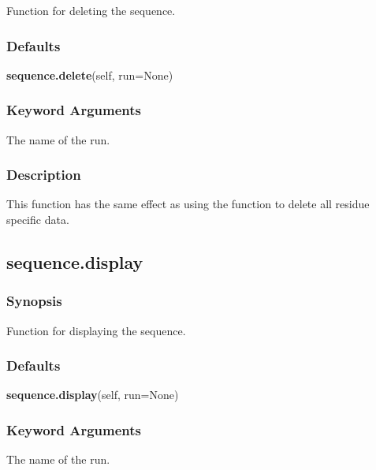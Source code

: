 Function for deleting the sequence.



\subsubsection{Defaults}

\textsf{\textbf{sequence.delete}(self, run=None)}


\subsubsection{Keyword Arguments}

  The name of the run. 




\subsubsection{Description}

This function has the same effect as using the  function to delete all residue specific data.




\newpage

\subsection{sequence.display}


\subsubsection{Synopsis}

Function for displaying the sequence.



\subsubsection{Defaults}

\textsf{\textbf{sequence.display}(self, run=None)}


\subsubsection{Keyword Arguments}

  The name of the run. 





